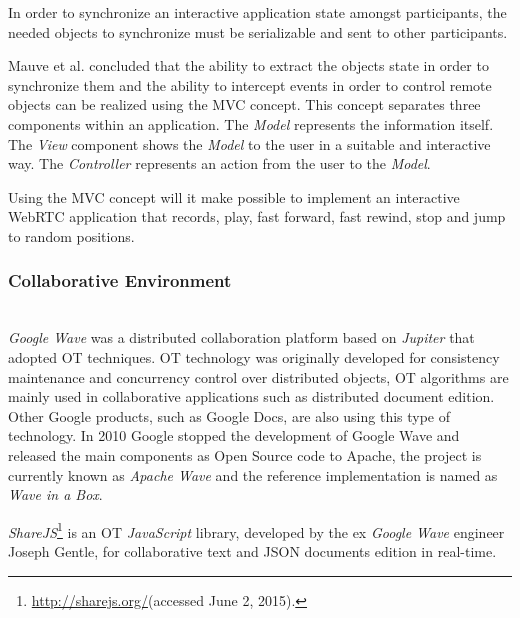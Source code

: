 	In order to synchronize an interactive application state amongst participants, the needed objects to synchronize must be serializable and sent to other participants.

	Mauve et al. concluded that the ability to extract the objects state in order to synchronize them and the ability to intercept events in order to control remote objects can be realized using the \ac{MVC} concept\cite{interactive_stream}.
        This concept separates three components within an application. The \emph{Model} represents the information itself. The \emph{View} component shows the \emph{Model} to the user in a suitable and interactive way. The \emph{Controller} represents an action from the user to the \emph {Model}. 

	Using the \ac{MVC} concept will it make possible to implement an interactive \ac{WebRTC} application that records, play, fast forward, fast rewind, stop and jump to random positions.
        
    

  \subsubsection{Collaborative Environment}\label{collabenv}~\\
	\emph{Google Wave} was a distributed collaboration platform based on \emph{Jupiter}\cite{jupiter} that adopted \ac{OT} techniques.
        	\ac{OT} technology was originally developed for consistency maintenance and concurrency control over distributed objects, \ac{OT} algorithms are mainly used in collaborative applications such as distributed document edition.
                Other Google products, such as Google Docs, are also using this type of technology. In 2010 Google stopped the development of Google Wave and released the main components as Open Source code to Apache, the project is currently known as \emph{Apache Wave} and the reference implementation is named as \emph{Wave in a Box}.

	\emph{ShareJS}\footnote{\url{http://sharejs.org/}(accessed June 2, 2015).} is an \ac{OT} \emph{JavaScript} library, developed by the ex \emph{Google Wave} engineer Joseph Gentle, for collaborative text and \ac{JSON} documents edition in real-time.

